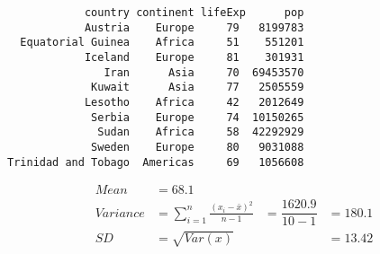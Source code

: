 \documentclass[17pt]{beamer} %
\begin{document}

\begin{frame}[fragile]
\footnotesize
\begin{verbatim}
            country continent lifeExp      pop
            Austria    Europe     79   8199783
  Equatorial Guinea    Africa     51    551201
            Iceland    Europe     81    301931
               Iran      Asia     70  69453570
             Kuwait      Asia     77   2505559
            Lesotho    Africa     42   2012649
             Serbia    Europe     74  10150265
              Sudan    Africa     58  42292929
             Sweden    Europe     80   9031088
Trinidad and Tobago  Americas     69   1056608
\end{verbatim}

\vspace{-1.5em}
\begin{align*}
Mean &= 68.1\\
Variance &= \sum\limits_{i=1}^{n} \frac{(x_i - \bar{x})^2}{n-1} &= \dfrac{1620.9}{10-1} &= 180.1 \\
SD &= \sqrt{Var(x)} & &= 13.42 \\
\end{align*}


\end{frame}


\end{document}
